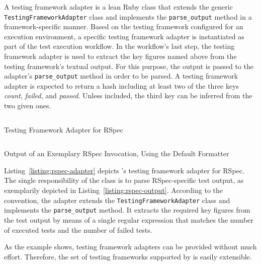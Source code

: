 A testing framework adapter is a lean Ruby class that extends the generic \texttt{TestingFrameworkAdapter} class and implements the \texttt{parse_output} method in a framework-specific manner. Based on the testing framework configured for an execution environment, a specific testing framework adapter is instantiated as part of the test execution workflow. In the workflow's last step, the testing framework adapter is used to extract the key figures named above from the testing framework's textual output. For this purpose, the output is passed to the adapter's \texttt{parse_output} method in order to be parsed. A testing framework adapter is expected to return a hash including at least two of the three keys \emph{count}, \emph{failed}, and \emph{passed}. Unless included, the third key can be inferred from the two given ones.

\begin{listing}
\inputminted[frame=lines]{rb}{listings/rspec_adapter.rb}
\vspace{-0.33cm}
\caption{Testing Framework Adapter for RSpec}
\label{listing:rspec-adapter}
\end{listing}

\begin{listing}[h]
\inputminted[frame=lines]{text}{listings/rspec-output.txt}
\vspace{-0.33cm}
\caption{Output of an Exemplary RSpec Invocation, Using the Default Formatter}
\label{listing:rspec-output}
\end{listing}

Listing~\ref{listing:rspec-adapter} depicts \tool's testing framework adapter for RSpec. The single responsibility of the class is to parse RSpec-specific test output, as exemplarily depicted in Listing~\ref{listing:rspec-output}. According to the convention, the adapter extends the \texttt{TestingFrameworkAdapter} class and implements the \texttt{parse_output} method. It extracts the required key figures from the test output by means of a single regular expression that matches the number of executed tests and the number of failed tests.

As the example shows, testing framework adapters can be provided without much effort. Therefore, the set of testing frameworks supported by \tool is easily extensible.

